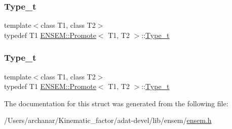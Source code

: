 \subsubsection{\texorpdfstring{Type\_t}{Type\_t}\hspace{0.1cm}{\footnotesize\ttfamily [2/3]}}
{\footnotesize\ttfamily template$<$class T1, class T2$>$ \\
typedef T1 \mbox{\hyperlink{structENSEM_1_1Promote}{E\+N\+S\+E\+M\+::\+Promote}}$<$ T1, T2 $>$\+::\mbox{\hyperlink{structENSEM_1_1Promote_a6a7260634b484365b9d70ccf3c0fd6fd}{Type\+\_\+t}}}

\mbox{\label{structENSEM_1_1Promote_a6a7260634b484365b9d70ccf3c0fd6fd}} 
\subsubsection{\texorpdfstring{Type\_t}{Type\_t}\hspace{0.1cm}{\footnotesize\ttfamily [3/3]}}
{\footnotesize\ttfamily template$<$class T1, class T2$>$ \\
typedef T1 \mbox{\hyperlink{structENSEM_1_1Promote}{E\+N\+S\+E\+M\+::\+Promote}}$<$ T1, T2 $>$\+::\mbox{\hyperlink{structENSEM_1_1Promote_a6a7260634b484365b9d70ccf3c0fd6fd}{Type\+\_\+t}}}



The documentation for this struct was generated from the following file\+:\begin{DoxyCompactItemize}
\item 
/\+Users/archanar/\+Kinematic\+\_\+factor/adat-\/devel/lib/ensem/\mbox{\hyperlink{adat-devel_2lib_2ensem_2ensem_8h}{ensem.\+h}}\end{DoxyCompactItemize}
